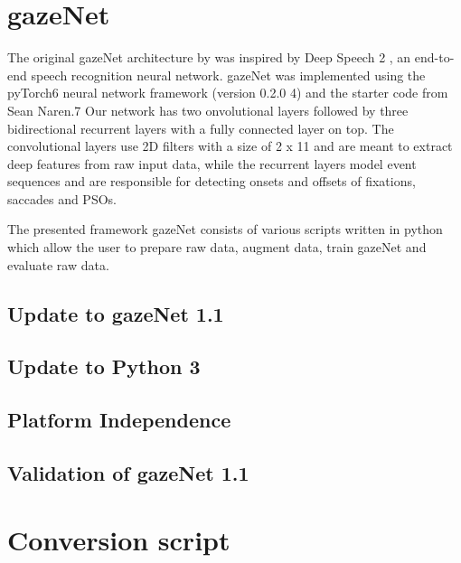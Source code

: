 \documentclass[conference]{IEEEtran}
\begin{document}
\section{gazeNet}
The original gazeNet architecture by \citet{zemblys2018gazeNet} was inspired by Deep Speech 2 \citeauthor{deep_speech_2}, an end-to-end speech recognition neural network. gazeNet was implemented using the pyTorch6 neural network framework (version 0.2.0 4) and the starter code from Sean Naren.7 Our network has two onvolutional layers followed by three bidirectional recurrent layers with a fully connected layer on top. The convolutional layers use 2D filters with a size of 2 x 11 and are meant to extract deep features from raw input data, while the recurrent layers model event sequences and are responsible for detecting onsets and offsets of fixations, saccades and PSOs. \citet{zemblys2018gazeNet}

The presented framework gazeNet consists of various scripts written in python which allow the user to prepare raw data, augment data, train gazeNet and evaluate raw data.



\subsection{Update to gazeNet 1.1}
\subsection{Update to Python 3}

\subsection{Platform Independence}

\subsection{Validation of gazeNet 1.1}

\section{Conversion script}



\end{document}
